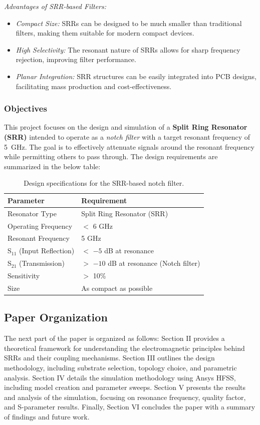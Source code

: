 \documentclass[conference]{IEEEtran}
\begin{document}
\textit{Advantages of SRR-based Filters:}
\begin{itemize}
    \item \textit{Compact Size:} SRRs can be designed to be much smaller than traditional filters, making them suitable for modern compact devices.
    \item \textit{ High Selectivity:} The resonant nature of SRRs allows for sharp frequency rejection, improving filter performance.
    \item \textit{Planar Integration:} SRR structures can be easily integrated into PCB designs, facilitating mass production and cost-effectiveness.
\end{itemize}
\subsubsection{Objectives}
This project focuses on the design and simulation of a \textbf{Split Ring Resonator (SRR)} intended to operate as a \textit{notch filter} with a target resonant frequency of 5~GHz. The goal is to effectively attenuate signals around the resonant frequency while permitting others to pass through. The design requirements are summarized in the below table:

\begin{table}[ht]
\centering
\begin{tabular}{|l|l|}
\hline
\textbf{Parameter} & \textbf{Requirement} \\ \hline
Resonator Type     & Split Ring Resonator (SRR) \\ \hline
Operating Frequency & $ < $ 6 GHz \\ \hline
Resonant Frequency  & 5 GHz \\ \hline
S$_{11}$ (Input Reflection) & $<$ $-5$ dB at resonance \\ \hline
S$_{21}$ (Transmission) &$ >$ $-10$ dB at resonance (Notch filter) \\ \hline
Sensitivity         & $> $ 10\% \\ \hline
Size                & As compact as possible \\ \hline
\end{tabular}
\caption*{Design specifications for the SRR-based notch filter.}
\end{table}

\subsection{Paper Organization}
The next part of the paper is organized as follows: Section II provides a theoretical framework for understanding the electromagnetic principles behind SRRs and their coupling mechanisms. Section III outlines the design methodology, including substrate selection, topology choice, and parametric analysis. Section IV details the simulation methodology using Ansys HFSS, including model creation and parameter sweeps. Section V presents the results and analysis of the simulation, focusing on resonance frequency, quality factor, and S-parameter results. Finally, Section VI concludes the paper with a summary of findings and future work.
\end{document}
